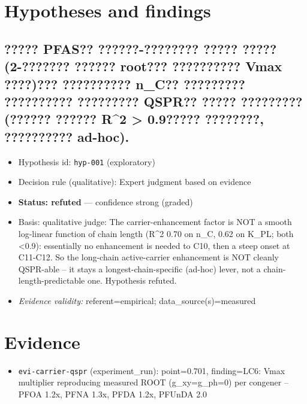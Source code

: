 \documentclass{article}
\begin{document}
\section{Hypotheses and findings}

\subsection{????? PFAS?? ??????-???????? ????? ?????(2-??????? ?????? root??? ?????????? Vmax ????)??? ??????????
n\_C?? ????????? ?????????? ????????? QSPR?? ????? ????????? (?????? ?????? R\textasciicircum{}2 > 0.9????? ????????,
?????????? ad-hoc).}
\begin{itemize}
  \item Hypothesis id: \texttt{hyp-001} (exploratory)
  \item Decision rule (qualitative): Expert judgment based on evidence
  \item \textbf{Status: refuted} --- confidence strong (graded)
  \item Basis: qualitative judge: The carrier-enhancement factor is NOT a smooth log-linear function of chain length (R\textasciicircum{}2 0.70 on n\_C, 0.62 on K\_PL; both <0.9): essentially no enhancement is needed to C10, then a steep onset at C11-C12. So the long-chain active-carrier enhancement is NOT cleanly QSPR-able -- it stays a longest-chain-specific (ad-hoc) lever, not a chain-length-predictable one. Hypothesis refuted.
  \item \textit{Evidence validity:} referent=empirical; data\_source(s)=measured
\end{itemize}

\section{Evidence}
\begin{itemize}
  \item \texttt{evi-carrier-qspr} (experiment\_run): point=0.701, finding=LC6: Vmax multiplier reproducing measured ROOT (g\_xy=g\_ph=0) per congener -- PFOA 1.2x, PFNA 1.3x, PFDA 1.2x, PFUnDA 2.0
\end{itemize}
\end{document}
